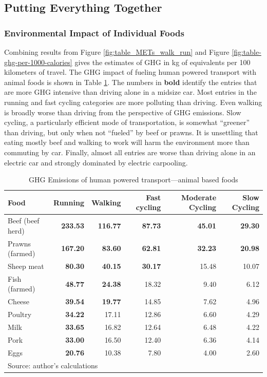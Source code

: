 \documentclass{article}[12pt,letterpaper]
\begin{document}
\subsection{Putting Everything Together}
\subsubsection{Environmental Impact of Individual Foods}
Combining results from Figure \ref{fig:table_METs_walk_run} and Figure \ref{fig:table-ghg-per-1000-calories} gives the estimates of GHG in kg of \cadi equivalents per 100 kilometers of travel.
The GHG impact of fueling human powered transport with animal foods is shown in Table \ref{tab:table_co2_eq_100_km_animals}. The numbers in {\bf bold} identify the entries that are more GHG intensive than driving alone in a midsize car. Most entries in the running and fast cycling categories are more polluting than driving. Even walking is broadly worse than driving from the perspective of GHG emissions. Slow cycling, a particularly efficient mode of transportation, is somewhat ``greener'' than driving, but only when not ``fueled'' by beef or prawns. It is unsettling that eating mostly beef and walking to work will harm the environment more than commuting by car. Finally, almost all entries are worse than driving alone in an electric car and strongly dominated by electric carpooling.
\begin{table}[ht]
  \begin{center}
    \caption{GHG Emissions of human powered transport---animal based foods}
    \label{tab:table_co2_eq_100_km_animals}
    \begin{tabular}{l|r|r|r|r|r}
      \hline
      Food	&	Running	&	Walking	&	Fast cycling	&	Moderate Cycling	&	Slow  Cycling	\\
      \hline
      Beef (beef herd)	&	{\bf 233.53}	&	{\bf 116.77}	&	{\bf 87.73}	&	{\bf 45.01}	&	{\bf 29.30}	\\
      Prawns (farmed)	&	{\bf 167.20}	&	{\bf 83.60}	&	{\bf 62.81}	&	{\bf 32.23}	&	{\bf 20.98}	\\
      Sheep meat	&	{\bf 80.30}	&	{\bf 40.15}	&	{\bf 30.17}	&	15.48	&	10.07	\\
      Fish (farmed)	&	{\bf 48.77}	&	{\bf 24.38}	&	18.32	&	9.40	&	6.12	\\
      Cheese	&	{\bf 39.54}	&	{\bf 19.77}	&	14.85	&	7.62	&	4.96	\\
      Poultry 	&	{\bf 34.22}	&	17.11	&	12.86	&	6.60	&	4.29	\\
      Milk	&	{\bf 33.65}	&	16.82	&	12.64	&	6.48	&	4.22	\\
      Pork	&	{\bf 33.00}	&	16.50	&	12.40	&	6.36	&	4.14	\\
      Eggs	&	{\bf 20.76}	&	10.38	&	7.80	&	4.00	&	2.60	\\
      \hline
      \multicolumn{6}{l}{Source: author's calculations}
    \end{tabular}
  \end{center}
\end{table}
\end{document}
